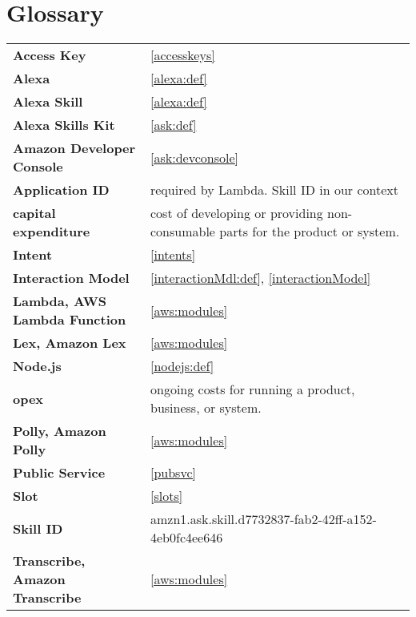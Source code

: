 \newpage
\section*{Glossary}
%

\begin{flushleft}
\begin{tabular}{ll}

\textbf{Access Key}			&	 	\ref{accesskeys}\\


\textbf{Alexa}				&		\ref{alexa:def}\\
\textbf{Alexa Skill}		&		\ref{alexa:def}\\
\textbf{Alexa Skills Kit}	&		\ref{ask:def}\\
\textbf{Amazon Developer Console}&	\ref{ask:devconsole}\\

\textbf{Application ID}		&	required by Lambda. Skill ID in our context\\

\textbf{capital expenditure}	&	cost of developing or providing non-consumable parts for the product or system.\\


\textbf{Intent}				&		\ref{intents}\\
\textbf{Interaction Model}	&		\ref{interactionMdl:def}, \ref{interactionModel}\\



\textbf{Lambda, AWS Lambda Function}	&		\ref{aws:modules}\\
\textbf{Lex, Amazon Lex}	&		\ref{aws:modules}\\

\textbf{Node.js}			&		\ref{nodejs:def}\\

\textbf{opex}				&  ongoing costs for running a product, business, or system. \\


\textbf{Polly, Amazon Polly}&		\ref{aws:modules}\\
\textbf{Public Service}			&	\ref{pubsvc}\\
\textbf{Slot}				&		\ref{slots}\\
\textbf{Skill ID}			&	amzn1.ask.skill.d7732837-fab2-42ff-a152-4eb0fc4ee646\\
\textbf{Transcribe, Amazon Transcribe}	&		\ref{aws:modules}\\


\end{tabular}
\end{flushleft}
